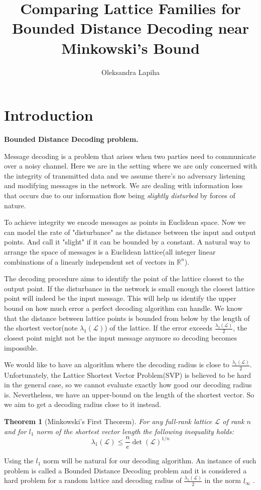 \documentclass[12pt]{article}
\title{Comparing Lattice Families for Bounded Distance Decoding near Minkowski’s Bound}
\author{ Oleksandra Lapiha }
\newcommand{\LL}{\mathcal{L}}
\newtheorem{theorem}{Theorem}
\begin{document}
\maketitle



\section{Introduction}
\label{sec:intro}



\textbf{Bounded Distance Decoding problem.}

Message decoding is a problem that arises when two parties need to communicate over a noisy channel. Here we are in the setting where we are only concerned with the integrity of transmitted data and we assume there's no adversary listening and modifying messages in the network. We are dealing with information loss that occurs due to our information flow being \textit{slightly disturbed} by forces of nature.

To achieve integrity we encode messages as points in Euclidean space. Now we can model the rate of "disturbance" as the distance between the input and output points. And call it "slight" if it can be bounded by a constant. A natural way to arrange the space of messages is a Euclidean lattice(all integer linear combinations of a linearly independent set of vectors in $\mathbb{R}^{n}$).

The decoding procedure aims to identify the point of the lattice closest to the output point. If the disturbance in the network is small enough the closest lattice point will indeed be the input message. This will help us identify the upper bound on how much error a perfect decoding algorithm can handle. We know that the distance between lattice points is bounded from below by the length of the shortest vector(note $\lambda_{1}(\LL)$) of the lattice. If the error exceeds $\frac{\lambda_{1}(\LL)}{2}$, the closest point might not be the input message anymore so decoding becomes impossible.

We would like to have an algorithm where the decoding radius is close to $\frac{\lambda_{1}(\LL)}{2}$. Unfortunately, the Lattice Shortest Vector Problem(SVP) is believed to be hard in the general case, so we cannot evaluate exactly how good our decoding radius is. Nevertheless, we have an upper-bound on the length of the shortest vector. So we aim to get a decoding radius close to it instead.
\begin{theorem}[Minkowski's First Theorem]
    For any full-rank lattice $\LL$ of rank $n$ and for $l_1$ norm of the shortest vector length the following inequality holds:
    \[
        \lambda_{1}(\LL) \leq \frac{n}{e} \det(\LL)^{1/n}
    \]
\end{theorem}
Using the $l_1$ norm will be natural for our decoding algorithm.
An instance of such problem is called a Bounded Distance Decoding problem and it is considered a hard problem for a random lattice and decoding radius of $\frac{\lambda_{1}(\LL)}{2}$ in the norm $l_{\infty}$ \cite{[LM09]}.
\end{document}
